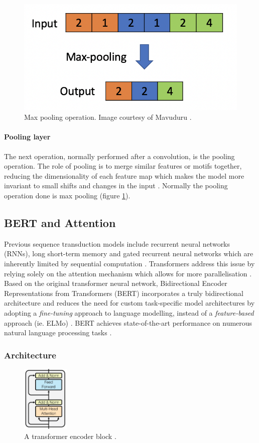 \documentclass{article}
\begin{document}
\begin{figure}[H]
    \centering
    \includegraphics[width=0.4\linewidth]{images/maxpool.png}
    \caption{Max pooling operation. Image courtesy of Mavuduru \cite{maxpool}.}
    \label{fig:maxpool}
\end{figure}

\paragraph{Pooling layer} The next operation, normally performed after a convolution, is the pooling operation. The role of pooling is to merge similar features or motifs together, reducing the dimensionality of each feature map which makes the model more invariant to small shifts and changes in the input \cite{LeCun2015}. Normally the pooling operation done is max pooling (figure \ref{fig:maxpool}).

\subsection{BERT and Attention}
Previous sequence transduction models include recurrent neural networks (RNNs), long short-term memory \cite{lstm1997} and gated recurrent neural networks \cite{chung2014empirical} which are inherently limited by sequential computation \cite{vaswani2017attention}. Transformers address this issue by relying solely on the attention mechanism which allows for more parallelisation \cite{vaswani2017attention}. Based on the original transformer neural network, Bidirectional Encoder Representations from Transformers (BERT) incorporates a truly bidirectional architecture and reduces the need for custom task-specific model architectures by adopting a  \textit{fine-tuning} approach to language modelling, instead of a \textit{feature-based} approach (ie. ELMo) \cite{devlin2019bert}. BERT achieves state-of-the-art performance on numerous natural language processing tasks \cite{devlin2019bert}. 

\subsubsection{Architecture}
\begin{figure}
\centering
\includegraphics[width=0.2\textwidth]{images/encoder.png}
\caption{\label{fig:encoder}A transformer encoder block \cite{vaswani2017attention}.}
\end{figure}
\end{document}
